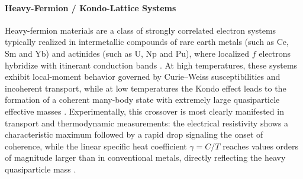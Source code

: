 \paragraph{Heavy-Fermion / Kondo-Lattice Systems}
Heavy-fermion materials are a class of strongly correlated electron systems typically realized in intermetallic compounds of rare earth metals (such as Ce, Sm and Yb) and actinides (such as U, Np and Pu), where localized $f$ electrons hybridize with itinerant conduction bands \cite{Stewart1984,Wirth2016}. At high temperatures, these systems exhibit local-moment behavior governed by Curie--Weiss susceptibilities and incoherent transport, while at low temperatures the Kondo effect leads to the formation of a coherent many-body state with extremely large quasiparticle effective masses \cite{hewson1993}. Experimentally, this crossover is most clearly manifested in transport and thermodynamic measurements: the electrical resistivity shows a characteristic maximum followed by a rapid drop signaling the onset of coherence, while the linear specific heat coefficient $\gamma=C/T$ reaches values orders of magnitude larger than in conventional metals, directly reflecting the heavy quasiparticle mass \cite{Lohneysen2007}.

